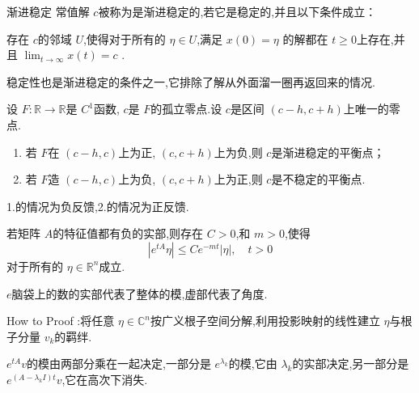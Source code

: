 \documentclass[lang=cn,12pt,color=green,fontset=none]{elegantbook}
\begin{document}
\begin{definition}{渐进稳定}
    常值解 $ c $被称为是渐进稳定的,若它是稳定的,并且以下条件成立：
    
    存在 $ c $的邻域 $ U $,使得对于所有的 $ \eta  \in U $,满足 $ x\left( 0 \right)=\eta   $ 的解都在 $ t \ge 0 $上存在,并且 $ \lim_{t \to \infty}x\left( t \right)=c  $ . 
\end{definition}
\begin{remark}
    稳定性也是渐进稳定的条件之一,它排除了解从外面溜一圈再返回来的情况.
\end{remark}

\begin{example}
    设 $ F: \mathbb{R} \to \mathbb{R}  $是 $ C^{1} $函数, $ c $是 $ F $的孤立零点.设 $ c $是区间 $ \left( c-h,c+ h \right)  $上唯一的零点.
    \begin{enumerate}
        \item 若 $ F $在 $ \left( c-h,c \right)  $上为正, $ \left( c,c+ h \right)  $上为负,则 $ c $是渐进稳定的平衡点；
        \item 若 $ F $造 $ \left( c-h,c \right)  $上为负, $ \left( c,c+ h \right)  $上为正,则 $ c $是不稳定的平衡点.        
    \end{enumerate}
    
\end{example}

\begin{note}
    1.的情况为负反馈,2.的情况为正反馈.
\end{note}


\begin{lemma}\label{lem:nega-Re-lemma}
    若矩阵 $ A $的特征值都有负的实部,则存在 $ C>0 $,和 $ m>0 $,使得 $$
    \left| e^{tA}\eta  \right|\le  Ce^{-mt} \left| \eta  \right|,\quad t>0  
    $$   对于所有的 $ \eta \in \mathbb{R} ^{n} $成立. 
\end{lemma}
\begin{note}
     $ e $脑袋上的数的实部代表了整体的模,虚部代表了角度. 
\end{note}
\begin{note}
    How to Proof :将任意 $ \eta \in \mathbb{C}^{n} $按广义根子空间分解,利用投影映射的线性建立 $ \eta  $与根子分量 $ v_{k} $的羁绊.
    
    $ e^{tA}v $的模由两部分乘在一起决定,一部分是 $ e^{ \lambda _{k}} $的模,它由 $  \lambda _{k} $的实部决定,另一部分是 $ e^{\left( A- \lambda _{k}I \right) t} v$,它在高次下消失.     
\end{note}
\end{document}
